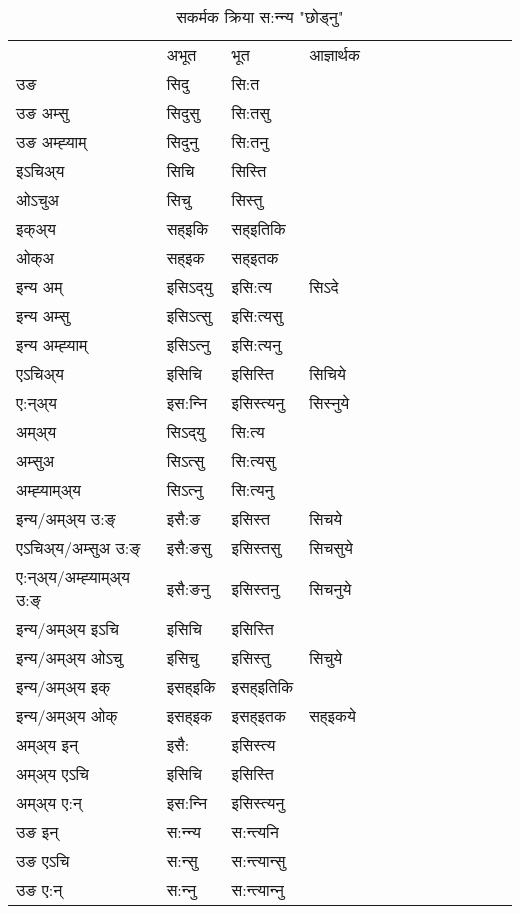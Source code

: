 \begin{table}[H]
\label{it.vt} \centering
\caption{सकर्मक क्रिया  स:न्‍न्य  "छोड्नु"  }
\begin{tabular}{l|l|l|l|l|l|l|l|l|l|l|l|l}  \toprule
&अभूत & भूत & आज्ञार्थक \\ 
उङ &सिदु &सि:त \\ 
उङ अम्सु &सिदुसु &सि:तसु \\ 
उङ अम्ह्‍याम् &सिदुनु &सि:तनु \\ 
इऽचिअ्य &सिचि &सिस्ति   \\ 
ओऽचुअ &सिचु &सिस्तु   \\ 
इक्अ्य &सह्इकि &सह्इतिकि   \\ 
ओक्अ &सह्इक &सह्इतक   \\ 
इन्य अम् & इसिऽद्‌यु  & इसि:त्य &सिऽदे  \\ 
इन्य अम्सु & इसिऽत्सु  & इसि:त्यसु   \\ 
इन्य अम्ह्‍याम् & इसिऽत्‍नु  & इसि:त्यनु   \\ 
एऽचिअ्य & इसिचि & इसिस्ति &सिचिये    \\ 
ए:न्अ्य & इस:न्‍नि  & इसिस्त्यनु &सिस्‍नुये  \\ 
अम्अ्य & सिऽद्‌यु  & सि:त्य  \\ 
अम्सुअ & सिऽत्सु & सि:त्यसु  \\ 
अम्ह्‍याम्अ्य & सिऽत्‍नु  & सि:त्यनु \\ 
\midrule
इन्य/अम्अ्य उ:ङ्‌&इसै:ङ & इसिस्त &सिचये \\ 
एऽचिअ्य/अम्सुअ उ:ङ्‌ &इसै:ङसु & इसिस्तसु &सिचसुये \\ 
ए:न्अ्य/अम्ह्‍याम्अ्य उ:ङ्‌ &इसै:ङनु & इसिस्तनु &सिचनुये \\ 
इन्य/अम्अ्य इऽचि & इसिचि & इसिस्ति    \\ 
इन्य/अम्अ्य ओऽचु & इसिचु & इसिस्तु  &सिचुये  \\ 
इन्य/अम्अ्य इक् & इसह्इकि & इसह्इतिकि   \\ 
इन्य/अम्अ्य ओक् & इसह्इक & इसह्इतक  &सह्इकये  \\ 
अम्अ्य इन् & इसै: & इसिस्त्य   \\ 
अम्अ्य एऽचि & इसिचि & इसिस्ति    \\ 
अम्अ्य ए:न् & इस:न्‍नि  & इसिस्त्यनु  \\ 
\midrule
उङ इन् & स:न्‍न्य  & स:न्त्यनि  \\ 
उङ एऽचि & स:न्सु  & स:न्त्यान्सु   \\ 
उङ ए:न्& स:न्‍नु  & स:न्त्यान्‍नु   \\ 
\bottomrule
\end{tabular}
\end{table}


